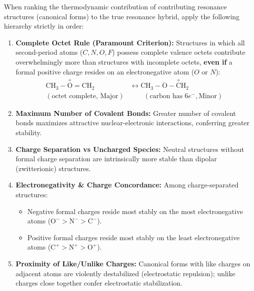 \documentclass[10pt,twoside,openright]{book}
\begin{document}
\begin{formulabox}
When ranking the thermodynamic contribution of contributing resonance structures (canonical forms) to the true resonance hybrid, apply the following hierarchy strictly in order:
\begin{enumerate}[leftmargin=*]
  \item \textbf{Complete Octet Rule (Paramount Criterion):} Structures in which all second-period atoms ($C, N, O, F$) possess complete valence octets contribute overwhelmingly more than structures with incomplete octets, \textbf{even if} a formal positive charge resides on an electronegative atom ($O$ or $N$):
  \begin{align}
    \mathrm{CH_3-\overset{+}{O}=CH_2} &\longleftrightarrow \mathrm{CH_3-\ddot{O}-\overset{+}{C}H_2} \\
    (\text{octet complete, Major}) &\quad\quad (\text{carbon has } 6e^-, \text{Minor})
  \end{align}
  \item \textbf{Maximum Number of Covalent Bonds:} Greater number of covalent bonds maximizes attractive nuclear-electronic interactions, conferring greater stability.
  \item \textbf{Charge Separation vs Uncharged Species:} Neutral structures without formal charge separation are intrinsically more stable than dipolar (zwitterionic) structures.
  \item \textbf{Electronegativity \& Charge Concordance:} Among charge-separated structures:
  \begin{itemize}
    \item Negative formal charges reside most stably on the most electronegative atoms ($\mathrm{O^-} > \mathrm{N^-} > \mathrm{C^-}$).
    \item Positive formal charges reside most stably on the least electronegative atoms ($\mathrm{C^+} > \mathrm{N^+} > \mathrm{O^+}$).
  \end{itemize}
  \item \textbf{Proximity of Like/Unlike Charges:} Canonical forms with like charges on adjacent atoms are violently destabilized (electrostatic repulsion); unlike charges close together confer electrostatic stabilization.
\end{enumerate}
\end{formulabox}
\end{document}
